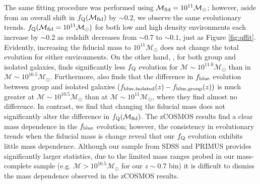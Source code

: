 \documentclass{emulateapj}
\begin{document}
The same fitting procedure was performed using $\mathcal{M}_{\rm{fid}} = 10^{11} \mathcal{M}_\odot$; however, aside from an overall shift in $f_{\rm{Q}}(\mathcal{M}_{\rm{fid}})$ by $\sim 0.2$, we observe the same evolutionary trends. $f_{\rm{Q}}(\mathcal{M}_{\rm{fid}} = 10^{11}\mathcal{M}_{\odot})$ for both low and high density environments each increase by $\sim 0.2$ as redshift decreases from $\sim 0.7$ to $\sim 0.1$, just as Figure \ref{fig:qffit}. Evidently, increasing the fiducial mass to $10^{11} \mathcal{M}_{\odot}$ does not change the total evolution for either environments. On the other hand, \cite{Iovino:2010aa}, for both group and isolated galaxies, finds significantly less $f_{\rm{Q}}$ evolution for $\mathcal{M} \sim 10^{11.0} \mathcal{M}_{\odot}$ than in $\mathcal{M} \sim 10^{10.5} \mathcal{M}_{\odot}$. Furthermore, \cite{Iovino:2010aa} also finds that the difference in $f_{\rm{blue}}$ evolution between group and isolated galaxies ($f_{\rm{blue}, \rm{isolated}}(z) - f_{\rm{blue}, \rm{group}}(z))$ is much greater at $\mathcal{M} \sim 10^{10.5} \mathcal{M}_{\odot}$ than at $\mathcal{M} \sim 10^{11} \mathcal{M}_{\odot}$, where they find almost no difference. In contrast, we find that changing the fiducial mass does not significantly alter the difference in $f_{\rm{Q}}(\mathcal{M}_{\rm{fid}})$. The zCOSMOS results find a clear mass dependence in the $f_{\rm{blue}}$ evolution; however, the consistency in evolutionary trends when the fiducial mass is change reveal that our $f_{\rm{Q}}$ evolution exhibits little mass dependence. Although our sample from SDSS and PRIMUS provides significantly larger statistics, due to the limited mass ranges probed in our mass-complete sample (e.g. $\mathcal{M} > 10^{10.5} \mathcal{M}_{\odot}$ for our $z \sim 0.7$ bin) it is difficult to dismiss the mass dependence observed in the zCOSMOS results.
\end{document}

